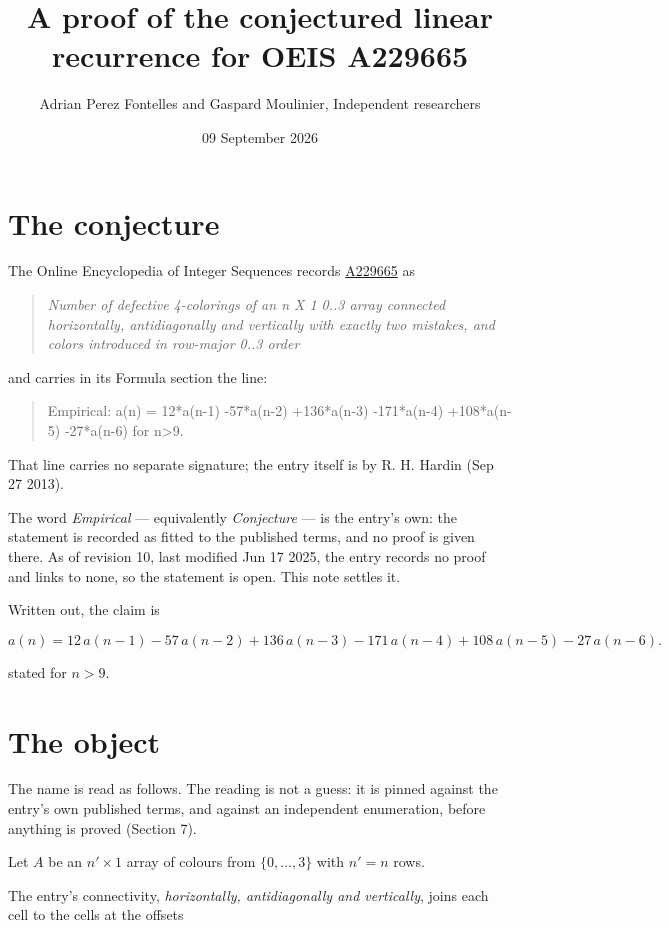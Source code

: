 \documentclass[11pt]{article}
\title{A proof of the conjectured linear recurrence for OEIS A229665}
\author{Adrian Perez Fontelles and Gaspard Moulinier, Independent researchers}
\date{09 September 2026}
\theoremstyle{definition}
\begin{document}
\maketitle
\section{The conjecture}

The Online Encyclopedia of Integer Sequences records \href{https://oeis.org/A229665}{A229665} as

\begin{quote}\itshape Number of defective 4-colorings of an n X 1 0..3 array connected horizontally, antidiagonally and vertically with exactly two mistakes, and colors introduced in row-major 0..3 order\end{quote}

and carries in its Formula section the line:

\begin{quote}\ttfamily Empirical: a(n) = 12*a(n-1) -57*a(n-2) +136*a(n-3) -171*a(n-4) +108*a(n-5) -27*a(n-6) for n>9.\end{quote}

That line carries no separate signature; the entry itself is by R. H. Hardin (Sep 27 2013).

The word {\itshape Empirical} --- equivalently {\itshape Conjecture} --- is the entry's own: the statement is recorded as fitted to the published terms, and no proof is given there. As of revision 10, last modified Jun 17 2025, the entry records no proof and links to none, so the statement is open. This note settles it.

Written out, the claim is

\[a(n) = 12\,a(n-1) - 57\,a(n-2) + 136\,a(n-3) - 171\,a(n-4) + 108\,a(n-5) - 27\,a(n-6).\]

stated for $n > 9$.

\section{The object}

The name is read as follows. The reading is not a guess: it is pinned against the entry's own published terms, and against an independent enumeration, before anything is proved (Section 7).

Let $A$ be an $n' \times 1$ array of colours from $\{0,\dots,3\}$ with $n' = n$ rows.

The entry's connectivity, {\itshape horizontally, antidiagonally and vertically}, joins each cell to the cells at the offsets
\end{document}
